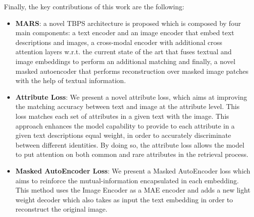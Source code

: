 \documentclass[acmsmall]{acmart}
\newcommand{\anote}[1]{\textcolor{red}{AP: #1}}
\begin{document}
Finally, the key contributions of this work are the following:
\begin{itemize}
    \item \textbf{MARS}: a novel TBPS architecture is proposed which is composed by four main components: a text encoder and an image encoder that embed text descriptions and images, a cross-modal encoder with additional cross attention layers w.r.t. the current state of the art that fuses textual and image embeddings to perform an additional matching and finally, a novel masked autoencoder that performs reconstruction over masked image patches with the help of textual information.
    \item \textbf{Attribute Loss}: We present a novel attribute loss, which aims at improving the matching accuracy between text and image at the attribute level. This loss matches each set of attributes in a given text with the image.  This approach enhances the model capability to provide to each attribute in a given text descriptions equal weight, in order to accurately discriminate between different identities. By doing so, the attribute loss allows the model to put attention on both common and rare attributes in the retrieval process.
    \item \textbf{Masked AutoEncoder Loss}: We present a Masked AutoEncoder loss which aims to reinforce the mutual-information encapsulated in each embedding. This method uses the Image Encoder as a MAE encoder and adds a new light weight decoder which also takes as input the text embedding in order to reconstruct the original image.
\end{itemize}
\end{document}
